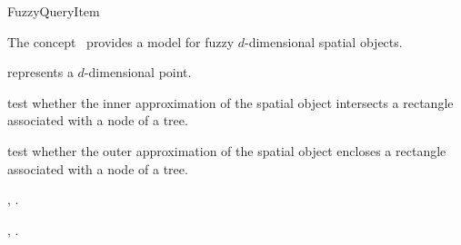 

\begin{ccRefConcept}{FuzzyQueryItem}


\ccDefinition
  
The concept \ccRefName\ provides a model for fuzzy $d$-dimensional spatial objects.

\ccParameters

 represents a $d$-dimensional point.

\ccTypes





\ccOperations


{test whether the inner approximation of the spatial object intersects a rectangle
associated with a node of a tree.}

{test whether the outer approximation of the spatial object encloses a rectangle
associated with a node of a tree.}


\ccHasModels

,
.

\ccSeeAlso

,
.


\end{ccRefConcept}


